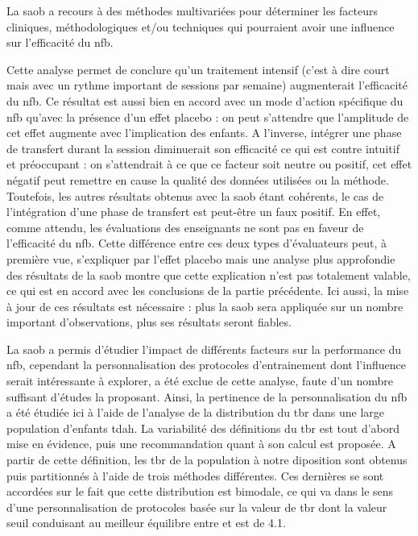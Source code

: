 La \gls{saob} a recours à des méthodes multivariées pour déterminer les facteurs cliniques, méthodologiques et/ou techniques qui pourraient avoir une 
influence sur l'efficacité du \gls{nfb}. 

Cette analyse permet de conclure qu'un traitement intensif (c'est à dire court mais avec un rythme important de sessions par semaine) augmenterait 
l'efficacité du \gls{nfb}. Ce résultat est aussi bien en accord avec un mode d'action spécifique du \gls{nfb} qu'avec la présence d'un effet placebo :
on peut s'attendre que l'amplitude de cet effet augmente avec l'implication des enfants. A l'inverse,  
intégrer une phase de transfert durant la session diminuerait son efficacité ce qui est contre intuitif et préoccupant : on s'attendrait à ce que ce facteur 
soit neutre ou positif, cet effet négatif peut remettre en cause la qualité des données utilisées ou la méthode. Toutefois, les autres résultats obtenus 
avec la \gls{saob} étant cohérents, le cas de l'intégration d'une phase de transfert est peut-être un faux positif. En effet, comme attendu, les évaluations des enseignants ne sont pas en faveur de l'efficacité du \gls{nfb}. 
Cette différence entre ces deux types d'évaluateurs peut, à première vue, s'expliquer par l'effet placebo mais une analyse plus approfondie des 
résultats de la \gls{saob} montre que cette explication n'est pas totalement valable, ce qui est en accord avec les conclusions de la partie précédente. 
Ici aussi, la mise à jour de ces résultats est nécessaire : plus la \gls{saob} sera appliquée sur un nombre important d'observations,
plus ses résultats seront fiables.

La \gls{saob} a permis d'étudier l'impact de différents facteurs sur la performance du \gls{nfb}, cependant la personnalisation 
des protocoles d'entrainement dont l'influence serait intéressante 
à explorer, a été exclue de cette analyse, faute d'un nombre suffisant d'études la proposant. Ainsi, la pertinence de la personnalisation 
du \gls{nfb} a été étudiée ici à l'aide de l'analyse de la distribution 
du \gls{tbr} dans une large population d'enfants \gls{tdah}. La variabilité des définitions du \gls{tbr} est tout d'abord mise en 
évidence, puis une recommandation quant à son calcul est proposée. A partir de cette définition, les \gls{tbr} de la population à notre diposition
sont obtenus puis partitionnés à l'aide de trois méthodes différentes. Ces dernières se sont accordées sur le fait que cette distribution 
est bimodale, ce qui va dans 
le sens d'une personnalisation de protocoles basée sur la valeur de \gls{tbr} dont la valeur seuil conduisant au meilleur équilibre entre 
 et  est de 4.1. 

